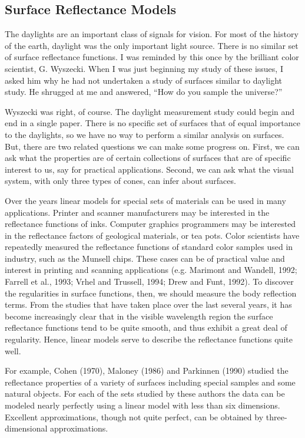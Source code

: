 \subsection*{Surface Reflectance Models}
The daylights are an important class of signals for vision.  For most
of the history of the earth, daylight was the only important light
source.  There is no similar set of surface reflectance functions.  I
was reminded by this once by the brilliant color scientist,
G. Wyszecki.  When I was just beginning my study of these issues, I
asked him why he had not undertaken a study of surfaces similar to
daylight study.  He shrugged at me and answered, ``How do you sample
the universe?''

Wyszecki was right, of course.  The daylight measurement study could
begin and end in a single paper.  There is no specific set of surfaces
that of equal importance to the daylights, so we have no way to
perform a similar analysis on surfaces.  But, there are two related
questions we can make some progress on.  First, we can ask what the
properties are of certain collections of surfaces that are of specific
interest to us, say for practical applications.  Second, we can ask
what the visual system, with only three types of cones, can infer
about surfaces.

Over the years linear models for special sets of materials can be used
in many applications.  Printer and scanner manufacturers may be
interested in the reflectance functions of inks.  Computer graphics
programmers may be interested in the reflectance factors of geological
materials, or tea pots.  Color scientists have repeatedly measured the
reflectance functions of standard color samples used in industry, such
as the Munsell chips.  These cases can be of practical value and
interest in printing and scanning applications (e.g. Marimont and
Wandell, 1992; Farrell et al., 1993; Vrhel and Trussell, 1994; Drew
and Funt, 1992).
To discover the regularities in surface functions, then, we should
measure the body reflection terms.  From the studies that have taken
place over the last several years, it has become increasingly clear
that in the visible wavelength region the surface reflectance
functions tend to be quite smooth, and thus exhibit a great deal of
regularity.  Hence, linear models serve to describe the reflectance
functions quite well.

For example, Cohen (1970), Maloney (1986) and Parkinnen (1990) studied
the reflectance properties of a variety of surfaces including special
samples and some natural objects.  For each of the sets studied by
these authors the data can be modeled nearly perfectly using a linear
model with less than six dimensions.  Excellent approximations, though
not quite perfect, can be obtained by three-dimensional
approximations.

